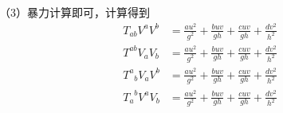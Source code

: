 \begin{solution}
	（3）暴力计算即可，计算得到
	\begin{align*}
		T_{ab}V^aV^b&=\frac{a u^2}{g^2}+\frac{b u v}{g h}+\frac{c u v}{g h}+\frac{d v^2}{h^2}\\
		T^{ab}V_aV_b&=\frac{a u^2}{g^2}+\frac{b u v}{g h}+\frac{c u v}{g h}+\frac{d v^2}{h^2}\\
		{T^a}_b V_aV^b&=\frac{a u^2}{g^2}+\frac{b u v}{g h}+\frac{c u v}{g h}+\frac{d v^2}{h^2}\\
		{T_a}^b V^a V_b&=\frac{a u^2}{g^2}+\frac{b u v}{g h}+\frac{c u v}{g h}+\frac{d v^2}{h^2}
	\end{align*}
\end{solution}
